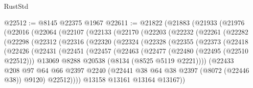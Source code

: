 \begin{lexlean}{RustStd}
\begin{coremodule}
@22512 := @8145 @22375 @1967
@22611 := @21822
    (@21883
      (@21933
        (@21976
          (@22016
            (@22064
              (@22107
                (@22133
                  (@22170
                    (@22203
                      (@22232
                        (@22261
                          (@22282
                            (@22298
                              (@22312
                                (@22316
                                  (@22320
                                    (@22324
                                      (@22328
                                        (@22355
                                          (@22373
                                            (@22418
                                              (@22426
                                                (@22431
                                                  (@22451
                                                    (@22457
                                                      (@22463
                                                        (@22477
                                                          (@22480 (@22495 (@22510 @22512)))
                                                          @13069
                                                          @8288
                                                          @20538
                                                          (@8134 (@8525 @5119 @2221))))
                                                      (@22433
                                                        @208
                                                        @97
                                                        @64
                                                        @66
                                                        @2397
                                                        @2240
                                                        (@22441
                                                          @38
                                                          @64
                                                          @38
                                                          @2397
                                                          (@8072 (@22446 @38))
                                                          @9120)
                                                        @22512))))
                                                @13158
                                                @13161
                                                @13164
                                                @13167))

\end{coremodule}
\end{lexlean}

